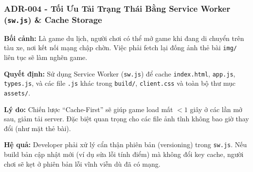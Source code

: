 
\subsubsection*{ADR-004 - Tối Ưu Tải Trạng Thái Bằng Service Worker (\texttt{sw.js}) \& Cache Storage}

\textbf{Bối cảnh:} Là game du lịch, người chơi có thể mở game khi đang di chuyển trên tàu xe, nơi kết nối mạng chập chờn. Việc phải fetch lại đống ảnh thẻ bài \texttt{img/} liên tục sẽ làm nghẽn game.

\textbf{Quyết định:} Sử dụng Service Worker (\texttt{sw.js}) để cache \texttt{index.html}, \texttt{app.js}, \texttt{types.js}, và các file \texttt{.js} khác trong \texttt{build/}, \texttt{client.css} và toàn bộ thư mục \texttt{assets/}.

\textbf{Lý do:} Chiến lược ``Cache-First'' sẽ giúp game load mất $< 1$ giây ở các lần mở sau, giảm tải server. Đặc biệt quan trọng cho các file ảnh tĩnh không bao giờ thay đổi (như mặt thẻ bài).

\textbf{Hệ quả:} Developer phải xử lý cẩn thận phiên bản (versioning) trong \texttt{sw.js}. Nếu build bản cập nhật mới (ví dụ sửa lỗi tính điểm) mà không đổi key cache, người chơi sẽ kẹt ở phiên bản lỗi vĩnh viễn dù đã có mạng.